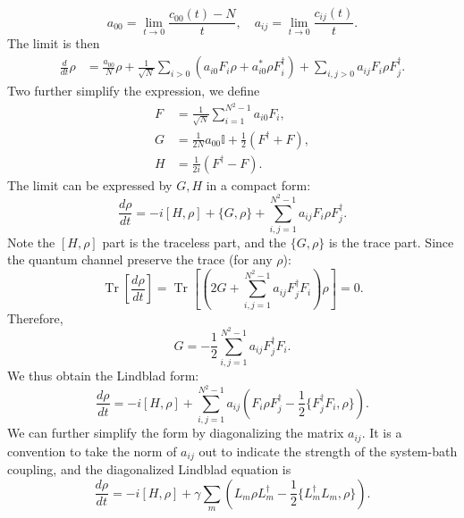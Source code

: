 \documentclass[aps,prb,superscriptaddress,nofootinbib]{revtex4}
\def \Tr{\operatorname{Tr}}
\begin{document}
\begin{equation}
	a_{00} = \lim_{t\rightarrow 0} \frac{c_{00}(t)-N}{t}, \quad
	a_{ij} = \lim_{t\rightarrow 0} \frac{c_{ij}(t)}{t}.
\end{equation}
The limit is then
\begin{equation}
\begin{aligned}
	\frac{d}{dt}\rho 
	&= \frac{a_{00}}{N}\rho + \frac{1}{\sqrt N} \sum_{i>0} \left(a_{i0} F_i \rho + a_{i0}^*\rho F_i^\dagger\right) + \sum_{i,j>0} a_{ij} F_i \rho F_j^\dagger. 
\end{aligned}
\end{equation}
Two further simplify the expression, we define
\begin{equation}
\begin{aligned}
	F &= \frac{1}{\sqrt N} \sum_{i=1}^{N^2-1} a_{i0} F_i, \\
	G &= \frac{1}{2N}a_{00}\mathbb I +\frac{1}{2}(F^\dagger+F), \\
	H &= \frac{1}{2i}(F^\dagger-F).
\end{aligned}
\end{equation}
The limit can be expressed by $G,H$ in a compact form:
\begin{equation}
	\frac{d\rho}{dt} = -i[H,\rho]+\{G, \rho\}+\sum_{i,j=1}^{N^2-1}a_{ij}F_i\rho F_j^\dagger.
\end{equation}
Note the $[H,\rho]$ part is the traceless part, and the $\{G,\rho\}$ is the trace part.
Since the quantum channel preserve the trace (for any $\rho$):
\begin{equation}
	\Tr\left[\frac{d\rho}{dt}\right]= \Tr\left[ \left(2G+\sum_{i,j=1}^{N^2-1}a_{ij}F_j^\dagger F_i \right)\rho \right]=0.
\end{equation}
Therefore,
\begin{equation}
	G = -\frac{1}{2}\sum_{i,j=1}^{N^2-1}a_{ij}F_j^\dagger F_i.
\end{equation}
We thus obtain the Lindblad form:
\begin{equation}
	\frac{d\rho}{dt} = -i[H,\rho]+\sum_{i,j=1}^{N^2-1}a_{ij} \left(F_i\rho F_j^\dagger-\frac{1}{2}\{F_j^\dagger F_i, \rho\} \right).
\end{equation}
We can further simplify the form by diagonalizing the matrix $a_{ij}$.
It is a convention to take the norm of $a_{ij}$ out to indicate the strength of the system-bath coupling, and the diagonalized Lindblad equation is
\begin{equation}
	\frac{d\rho}{dt} = -i[H,\rho]+ \gamma\sum_{m} \left(L_m\rho L_m^\dagger-\frac{1}{2}\{L_m^\dagger L_m, \rho\} \right).
\end{equation}
\end{document}
